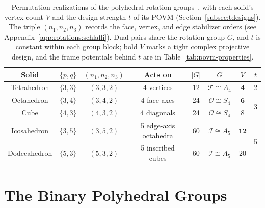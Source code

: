 \documentclass[11pt, oneside, openany]{scrbook}
\newcommand{\Tgroup}{\mathcal{T}}  %
\newcommand{\Ogroup}{\mathcal{O}}  %
\newcommand{\Igroup}{\mathcal{I}}  %
\begin{document}
\begin{table}[H]
\centering
\begin{tabular}{cccccccc}
\toprule
Solid & $\{p,q\}$ & $(n_1, n_2, n_3)$ & Acts on & $|G|$ & $G$ & $V$ & $t$ \\
\midrule
Tetrahedron  & $\{3,3\}$ & $(3,3,2)$ & 4 vertices            & 12 & $\Tgroup \cong A_4$ & $\mathbf{4}$  & 2 \\
Octahedron   & $\{3,4\}$ & $(3,4,2)$ & 4 face-axes           & 24 & $\Ogroup \cong S_4$ & $\mathbf{6}$  & \multirow{2}{*}{3} \\
Cube         & $\{4,3\}$ & $(4,3,2)$ & 4 diagonals           & 24 & $\Ogroup \cong S_4$ & $8$           & \\
Icosahedron  & $\{3,5\}$ & $(3,5,2)$ & 5 edge-axis octahedra & 60 & $\Igroup \cong A_5$ & $\mathbf{12}$ & \multirow{2}{*}{5} \\
Dodecahedron & $\{5,3\}$ & $(5,3,2)$ & 5 inscribed cubes     & 60 & $\Igroup \cong A_5$ & $20$          & \\
\bottomrule
\end{tabular}
\caption{Permutation realizations of the polyhedral rotation groups~\cite{vanhoboken2002platonicsolidsbinary}, with each solid's vertex count $V$ and the design strength $t$ of its POVM (Section~\ref{subsec:tdesigns}). The triple $(n_1, n_2, n_3)$ records the face, vertex, and edge stabilizer orders (see Appendix~\ref{app:rotations:schlafli}). Dual pairs share the rotation group $G$, and $t$ is constant within each group block; bold $V$ marks a tight complex projective design, and the frame potentials behind $t$ are in Table~\ref{tab:povm-properties}.}
\label{tab:permutation-structure}
\end{table}

\section{The Binary Polyhedral Groups} \label{sec:binary-polyhedral-groups}
\end{document}
